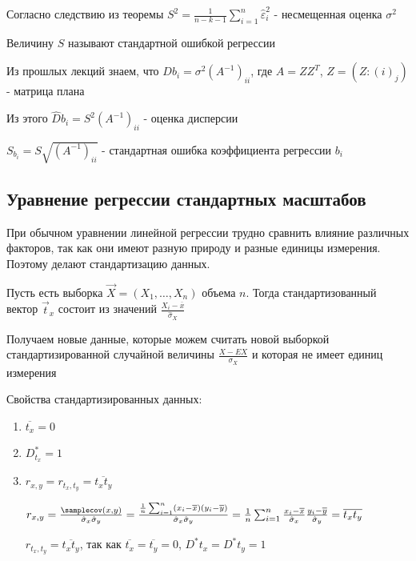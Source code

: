 \documentclass[12pt]{article}
\begin{document}
Согласно следствию из теоремы $S^2 = \frac{1}{n - k - 1} \sum_{i = 1}^n \hat \varepsilon_i^2$ - несмещенная оценка $\sigma^2$

\Def Величину $S$ называют стандартной ошибкой регрессии 

Из прошлых лекций знаем, что $D b_i = \sigma^2 (A^{-1})_{ii}$, где $A = Z Z^T$, $Z = (Z:{(i)}_j)$ - матрица плана

Из этого $\hat D b_i = S^2 (A^{-1})_{ii}$ - оценка дисперсии

\Def $S_{b_i} = S \sqrt{(A^{-1})_{ii}}$ - стандартная ошибка коэффициента регрессии $b_i$

\subsection{Уравнение регрессии стандартных масштабов}

\hypertarget{standard_regression_equation}{}

\Nota При обычном уравнении линейной регрессии трудно сравнить влияние различных факторов, так как они имеют 
разную природу и разные единицы измерения. Поэтому делают стандартизацию данных. 

Пусть есть выборка $\vec X = (X_1, \dots, X_n)$ объема $n$. Тогда стандартизованный вектор $\vec t_x$ состоит из значений $\frac{X_i - \overline{x}}{\hat \sigma_X}$

Получаем новые данные, которые можем считать новой выборкой стандартизированной случайной величины $\frac{X - EX}{\sigma_X}$ и которая не имеет единиц измерения

Свойства стандартизированных данных:

\begin{enumerate}
    \item $\overline{t_x} = 0$
    \item $D^*_{t_x} = 1$
    \item $r_{x,y} = r_{t_x, t_y} = \overline{t_x t_y}$
    \begin{MyProof}
        $r_{x,y} = \frac{\samplecov(x, y)}{\hat \sigma_x \hat \sigma_y} = 
        \frac{\frac{1}{n} \sum_{i = 1}^n (x_i - \overline{x})(y_i - \overline{y})}{\hat \sigma_x \hat \sigma_y} = 
        \frac{1}{n} \sum_{i = 1}^n \frac{x_i - \overline{x}}{\hat \sigma_x} \frac{y_i - \overline{y}}{\hat \sigma_y} = \overline{t_x t_y}$

        $r_{t_x, t_y} = \overline{t_x t_y}$, так как $\overline{t_x} = \overline{t_y} = 0$, $D^* t_x = D^* t_y = 1$
    \end{MyProof}
\end{enumerate}
\end{document}
